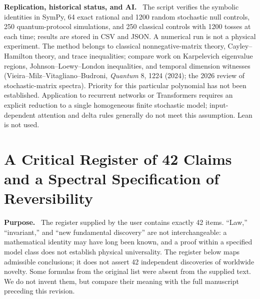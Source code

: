 \documentclass[11pt,a4paper,oneside]{book}
\newcommand{\note}[1]{\par\medskip\noindent\textbf{#1}\ }
\begin{document}
\note{Replication, historical status, and AI.} The script  verifies the symbolic identities in SymPy, 64 exact rational and 1200 random stochastic null controls, 250 quantum-protocol simulations, and 250 classical controls with 1200 tosses at each time; results are stored in CSV and JSON. A numerical run is not a physical experiment. The method belongs to classical nonnegative-matrix theory, Cayley--Hamilton theory, and trace inequalities; compare work on Karpelevich eigenvalue regions, Johnson--Loewy--London inequalities, and temporal dimension witnesses (Vieira--Milz--Vitagliano--Budroni, \emph{Quantum} 8, 1224 (2024); the 2026 review of stochastic-matrix spectra). Priority for this particular polynomial has not been established. Application to recurrent networks or Transformers requires an explicit reduction to a single homogeneous finite stochastic model; input-dependent attention and delta rules generally do not meet this assumption. Lean is not used.
\setcounter{equation}{141}


\chapter{A Critical Register of 42 Claims and a Spectral Specification of Reversibility}
\note{Purpose.} The register supplied by the user contains exactly 42 items. ``Law,'' ``invariant,'' and ``new fundamental discovery'' are not interchangeable: a mathematical identity may have long been known, and a proof within a specified model class does not establish physical universality. The register below maps admissible conclusions; it does not assert 42 independent discoveries of worldwide novelty. Some formulas from the original list were absent from the supplied text. We do not invent them, but compare their meaning with the full manuscript preceding this revision.
\end{document}
